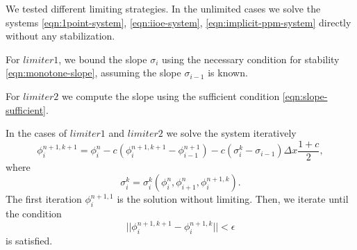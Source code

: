 \documentclass[../thesis.tex]{subfiles}
\begin{document}
We tested different limiting strategies. In the unlimited cases we solve the systems \eqref{eqn:1point-system}, \eqref{eqn:iioe-system}, \eqref{eqn:implicit-ppm-system} directly without any stabilization.

For \(limiter1\), we bound the slope \(\sigma_{i}\) using the necessary condition for stability \eqref{eqn:monotone-slope}, assuming the slope \(\sigma_{i-1}\) is known.

For \(limiter2\) we compute the slope using the sufficient condition \eqref{eqn:slope-sufficient}.

In the cases of \(limiter1\) and \(limiter2\) we solve the system iteratively
\begin{equation}
    \phi_{i}^{n+1,k+1}
    = \phi_{i}^{n} - c\left(
        \phi_{i}^{n+1,k+1}
        - \phi_{i-1}^{n+1}
        \right)
        -c\left(
        \sigma_{i}^{k} - \sigma_{i-1}
        \right)\Delta x\frac{1+c}{2},
\end{equation}
where
\[
    \sigma_{i}^{k} = \sigma_{i}^{k}(\phi_{i}^{n},\phi_{i+1}^{n},\phi_{i}^{n+1,k}).
\]
The first iteration \(\phi_{i}^{n+1,1}\) is the solution without limiting. Then, we iterate until the condition
\[
    ||\phi_{i}^{n+1,k+1} - \phi_{i}^{n+1,k}|| < \epsilon
\]
is satisfied.
\end{document}
